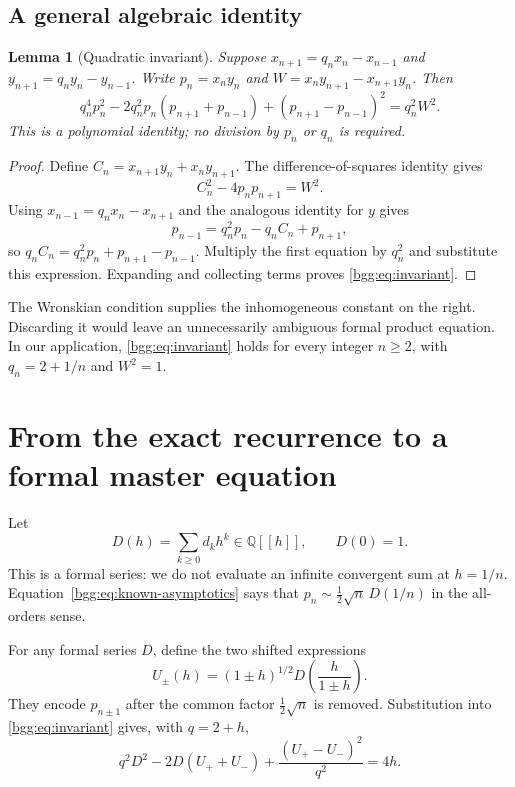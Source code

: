 \documentclass[11pt,a4paper]{article}
\numberwithin{equation}{section}
\newtheorem{lemma}[theorem]{Lemma}
\theoremstyle{definition}
\theoremstyle{remark}
\theoremstyle{definition}
\newcommand{\Q}{\mathbb Q}
\begin{document}
\subsection{A general algebraic identity}

\begin{lemma}[Quadratic invariant]\label{bgg:lem:invariant}
Suppose $x_{n+1}=q_nx_n-x_{n-1}$ and
$y_{n+1}=q_ny_n-y_{n-1}$. Write $p_n=x_ny_n$ and
$W=x_ny_{n+1}-x_{n+1}y_n$. Then
\begin{equation}\label{bgg:eq:invariant}
 q_n^4p_n^2-2q_n^2p_n(p_{n+1}+p_{n-1})
 +(p_{n+1}-p_{n-1})^2=q_n^2W^2.
\end{equation}
This is a polynomial identity; no division by $p_n$ or $q_n$ is required.
\end{lemma}

\begin{proof}
Define $C_n=x_{n+1}y_n+x_ny_{n+1}$. The difference-of-squares identity gives
\[
 C_n^2-4p_np_{n+1}=W^2.
\]
Using $x_{n-1}=q_nx_n-x_{n+1}$ and the analogous identity for $y$ gives
\[
 p_{n-1}=q_n^2p_n-q_nC_n+p_{n+1},
\]
so $q_nC_n=q_n^2p_n+p_{n+1}-p_{n-1}$. Multiply the first equation by $q_n^2$
and substitute this expression. Expanding and collecting terms proves
\eqref{bgg:eq:invariant}.
\end{proof}

The Wronskian condition supplies the inhomogeneous constant on the right.
Discarding it would leave an unnecessarily ambiguous formal product equation.
In our application, \eqref{bgg:eq:invariant} holds for every integer $n\ge2$,
with $q_n=2+1/n$ and $W^2=1$.

\section{From the exact recurrence to a formal master equation}
\label{bgg:sec:master}

Let
\begin{equation}\label{bgg:eq:D-definition}
 D(h)=\sum_{k\ge0}d_kh^k\in\Q[[h]],\qquad D(0)=1.
\end{equation}
This is a formal series: we do not evaluate an infinite convergent sum at
$h=1/n$. Equation~\eqref{bgg:eq:known-asymptotics} says that
$p_n\sim\frac12\sqrt n\,D(1/n)$ in the all-orders sense.

For any formal series $D$, define the two shifted expressions
\begin{equation}\label{bgg:eq:shift-U}
 U_\pm(h)=(1\pm h)^{1/2}D\!\left(\frac h{1\pm h}\right).
\end{equation}
They encode $p_{n\pm1}$ after the common factor $\frac12\sqrt n$ is removed.
Substitution into \eqref{bgg:eq:invariant} gives, with $q=2+h$,
\begin{equation}\label{bgg:eq:unscaled-invariant}
 q^2D^2-2D(U_++U_-)+\frac{(U_+-U_-)^2}{q^2}=4h.
\end{equation}
\end{document}
